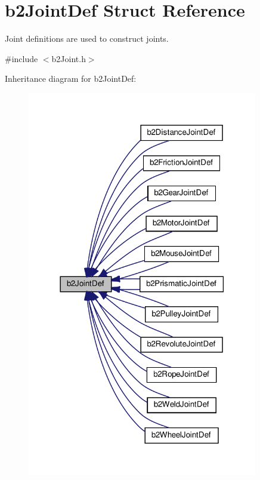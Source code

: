 \hypertarget{structb2JointDef}{}\section{b2\+Joint\+Def Struct Reference}
\label{structb2JointDef}


Joint definitions are used to construct joints.  




{\ttfamily \#include $<$b2\+Joint.\+h$>$}



Inheritance diagram for b2\+Joint\+Def\+:
\nopagebreak
\begin{figure}[H]
\begin{center}
\leavevmode
\includegraphics[width=285pt]{structb2JointDef__inherit__graph}
\end{center}
\end{figure}


